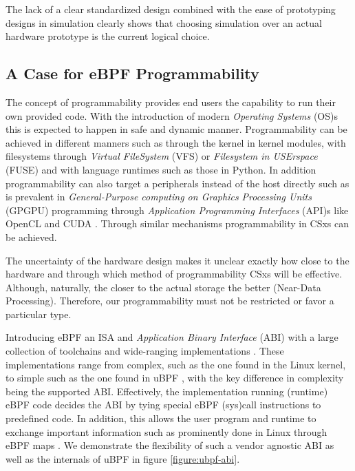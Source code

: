 The lack of a clear standardized design combined with the ease of prototyping
designs in simulation clearly shows that choosing simulation over an actual
hardware prototype is the current logical choice.

\subsection{A Case for eBPF Programmability}

The concept of programmability provides end users the capability to run their
own provided code. With the introduction of modern \textit{Operating Systems}
(OS)s this is expected to happen in safe and dynamic manner. Programmability
can be achieved in different manners such as through the kernel in kernel
modules, with filesystems through \textit{Virtual FileSystem} (VFS) \cite{vfs}
or \textit{Filesystem in USErspace} (FUSE) \cite{fuse} and with language
runtimes such as those in Python. In addition programmability can also target a
peripherals instead of the host directly such as is prevalent in
\textit{General-Purpose computing on Graphics Processing Units} (GPGPU)
programming through \textit{Application Programming Interfaces} (API)s like
OpenCL \cite{opencl} and CUDA \cite{cuda}. Through similar mechanisms
programmability in CSxs can be achieved.

The uncertainty of the hardware design makes it unclear exactly how close to the
hardware and through which method of programmability CSxs will be effective.
Although, naturally, the closer to the actual storage the better
(Near-Data Processing). Therefore, our programmability must not be restricted or
favor a particular type.

Introducing eBPF an ISA and \textit{Application Binary Interface} (ABI) with a
large collection of toolchains and wide-ranging implementations
\cite{what-ebpf, McCanne1993TheBP}. These implementations range from complex,
such as the one found in the Linux kernel, to simple such as the one found in
uBPF \cite{ubpf}, with the key difference in complexity being the supported ABI.
Effectively, the implementation running (runtime) eBPF code decides the ABI by
tying special eBPF (sys)call instructions to predefined code. In addition, this
allows the user program and runtime to exchange important information such as
prominently done in Linux through eBPF maps \cite{bpf-man}. We demonstrate the
flexibility of such a vendor agnostic ABI as well as the internals of uBPF in
figure \ref{figure:ubpf-abi}.

